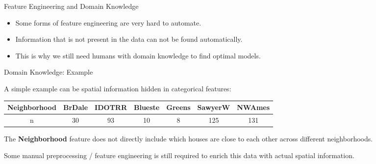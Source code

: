 



\begin{vbframe}{Feature Engineering and Domain Knowledge}
    \vspace{+.4cm}
    
    \begin{itemize}
        \item Some forms of feature engineering are very hard to automate.
        \item Information that is not present in the data can not be found automatically.
        \item This is why we still need humans with domain knowledge to find optimal models.
    \end{itemize}
\end{vbframe}

\begin{vbframe}{Domain Knowledge: Example}
    \vspace{+.4cm}
    
    A simple example can be spatial information hidden in categorical features:
    \vspace{+.4cm}
    
    \footnotesize
    \begin{tabular}{c|c|c|c|c|c|c}
        \hline
        Neighborhood & BrDale & IDOTRR & Blueste & Greens & SawyerW & NWAmes \\
        \hline
        n            & 30     & 93     & 10      & 8      & 125     & 131    \\
    \end{tabular}
    
    \vspace{0.3cm}
    
    \normalsize
    The \textbf{Neighborhood} feature does not directly include which houses are close to each other across different neighborhoods.
    \medskip
    
    Some manual preprocessing / feature engineering is still required to enrich this data with actual spatial information.
\end{vbframe}

